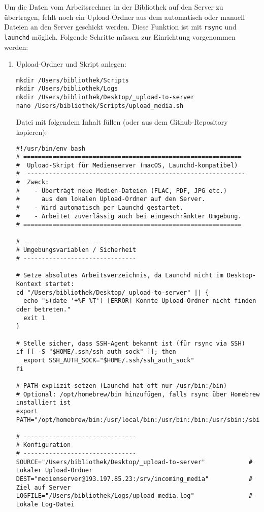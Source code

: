 \documentclass[12pt,a4paper]{report}
\begin{document}
  Um die Daten vom Arbeitsrechner in der Bibliothek auf den Server zu übertragen,
  fehlt noch ein Upload-Ordner aus dem automatisch oder manuell Dateien an den Server geschickt werden.
  Diese Funktion ist mit \texttt{rsync} und \texttt{launchd} möglich. 
  Folgende Schritte müssen zur Einrichtung vorgenommen werden:

  \begin{enumerate}
    \item Upload-Ordner und Skript anlegen:
    \begin{verbatim}
mkdir /Users/bibliothek/Scripts
mkdir /Users/bibliothek/Logs
mkdir /Users/bibliothek/Desktop/_upload-to-server
nano /Users/bibliothek/Scripts/upload_media.sh
    \end{verbatim}

    Datei mit folgendem Inhalt füllen (oder aus dem Github-Repository kopieren):

    \begin{verbatim}
#!/usr/bin/env bash
# ============================================================
#  Upload-Skript für Medienserver (macOS, Launchd-kompatibel)
#  ------------------------------------------------------------
#  Zweck:
#    - Überträgt neue Medien-Dateien (FLAC, PDF, JPG etc.)
#      aus dem lokalen Upload-Ordner auf den Server.
#    - Wird automatisch per Launchd gestartet.
#    - Arbeitet zuverlässig auch bei eingeschränkter Umgebung.
# ============================================================

# -------------------------------
# Umgebungsvariablen / Sicherheit
# -------------------------------

# Setze absolutes Arbeitsverzeichnis, da Launchd nicht im Desktop-Kontext startet:
cd "/Users/bibliothek/Desktop/_upload-to-server" || {
  echo "$(date '+%F %T') [ERROR] Konnte Upload-Ordner nicht finden oder betreten."
  exit 1
}

# Stelle sicher, dass SSH-Agent bekannt ist (für rsync via SSH)
if [[ -S "$HOME/.ssh/ssh_auth_sock" ]]; then
  export SSH_AUTH_SOCK="$HOME/.ssh/ssh_auth_sock"
fi

# PATH explizit setzen (Launchd hat oft nur /usr/bin:/bin)
# Optional: /opt/homebrew/bin hinzufügen, falls rsync über Homebrew installiert ist
export PATH="/opt/homebrew/bin:/usr/local/bin:/usr/bin:/bin:/usr/sbin:/sbin"

# -------------------------------
# Konfiguration
# -------------------------------
SOURCE="/Users/bibliothek/Desktop/_upload-to-server"            # Lokaler Upload-Ordner
DEST="medienserver@193.197.85.23:/srv/incoming_media"           # Ziel auf Server
LOGFILE="/Users/bibliothek/Logs/upload_media.log"               # Lokale Log-Datei


\end{verbatim}
\end{enumerate}
\end{document}
